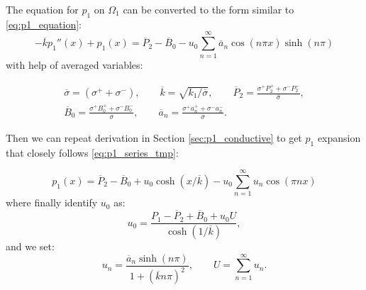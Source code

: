 \documentclass[a4paper,10pt]{article}
\def\ol#1{\overline{#1}}
\begin{document}
The equation for $p_1$ on $\Omega_1$ can be converted to the form similar to \eqref{eq:p1_equation}:
\begin{equation}
    \label{eq:p1_barrier_equation}
    - \ol{k}  p_1''(x) + p_1(x) = \ol{P}_2 - \ol{B}_0 - u_0\sum_{n=1}^{\infty} \ol{a}_n \cos(n \pi x) \sinh(n \pi)
\end{equation}
with help of averaged variables:


\begin{gather*}
    \ol{\sigma} = (\sigma^+ + \sigma^-), \qquad
    \ol{k} = \sqrt{k_1/\ol{\sigma}}, \qquad
    \ol{P}_2 = \frac{\sigma^+ P_2^+ + \sigma^- P_2^-}{\ol{\sigma}}, \\
%    
    \ol{B}_0 = \frac{\sigma^+ B_0^+ + \sigma^- B_0^-}{\ol{\sigma}}, \qquad
    \ol{a}_n = \frac{\sigma^+ a_n^+ + \sigma^- a_n^-}{\ol{\sigma}}.  
\end{gather*}

Then we can repeat derivation in Section \ref{sec:p1_conductive} to get $p_1$ expansion that closely follows
\eqref{eq:p1_series_tmp}:

\begin{equation}
    \label{eq:barrier_p1_series}
    p_1(x) = \ol{P}_2 -  \ol{B}_0 + u_0 \cosh(x/\ol{k}) - u_0 \sum_{n=1}^\infty  u_n \cos(\pi n x) 
\end{equation}
where finally identify $u_0$ as:
\begin{equation}
    \label{eq:barrier_u0_def}    
    u_0 = \frac{P_1 - \ol{P}_2 + \ol{B}_0 + u_0 U}{\cosh(1/\ol{k})},
\end{equation}
and we set:
\begin{equation}
    \label{eq:barriaer_un}
    u_n = \frac{\ol{a}_n \sinh(n \pi)}{1 + (\ol{k} n \pi)^2}, \qquad
    U =  \sum_{n=1}^{\infty} u_n.
\end{equation}
\end{document}
